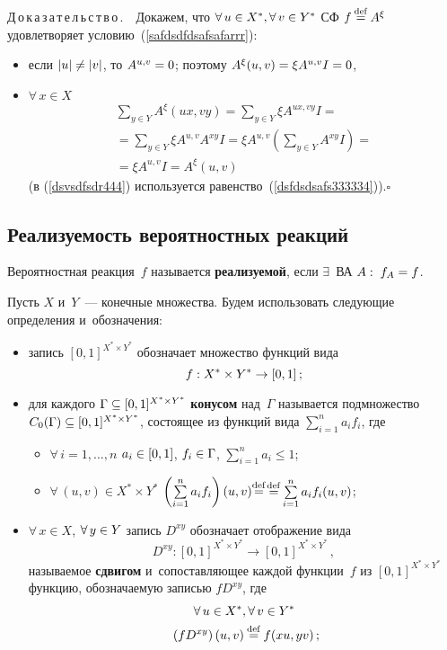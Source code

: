 \begin{multicols}{2}
\noindent
Д\,о\,к\,а\,з\,а\,т\,е\,л\,ь\,с\,т\,в\,о\,.\ \
Докажем, что  $\forall\,u\hm\in X^*,\forall\,v\hm\in Y^*$
СФ $f\mathbin{{\mathop{=}\limits^{\mathrm{def}}}} A^{\xi}$
удовлетворяет  условию~(\ref{safdsdfdsafsafarrr}):
\begin{itemize}
\item если $|u|\hm\neq |v|$, то $A^{u,v}\hm=0$;
поэтому $A^{\xi}(u,v) \hm= \xi A^{u,v} I\hm=0$,
\item $\forall\,x\in X$
\begin{multline}
\label{dsvsdfsdr444}
\sum\limits_{y\in Y}A^{\xi}(u x,v y)=
\sum\limits_{y\in Y}\xi A^{ux,vy} I=\\=
\sum\limits_{y\in Y}\xi A^{u,v} A^{xy} I=
\xi A^{u,v} (\sum\limits_{y\in Y}A^{xy} I)=\\=
\xi A^{u,v} I = A^\xi(u,v)
\end{multline}
(в (\ref{dsvsdfsdr444}) используется
равенство~(\ref{dsfdsdsafs333334})).\hfill$\square$
\end{itemize}

\subsection{Реализуемость вероятностных реакций}

Вероятностная реакция~$f$ называется \textbf{реализу\-емой}, если
$\exists$~ВА $A: \;f_A\hm=f$.


Пусть $X$ и~$Y$~--- конечные множества.
Будем использовать следующие определения и~обозначения:

\begin{itemize}
\item запись $[0,1]^{X^*\times Y^*}$ обозначает множество
 функций вида
 $$
 f:X^*\times Y^*\hm\to [0,1]\,;
 $$
\item для каждого $\Gamma\hm\subseteq [0,1]^{X^*\times Y^*}$
\textbf{конусом} над~$\Gamma$ называется подмножество
$C_0(\Gamma)\hm\subseteq [0,1]^{X^*\times Y^*}$,
состоящее из функций вида $\sum\limits_{i=1}^n
a_if_i$, где
\begin{itemize}
\item $\forall\,i=1,\ldots, n$ $a_i\hm\in [0,1]$,
$f_i\hm\in\Gamma$,
$\sum\limits_{i=1}^na_i\leq 1$;
\item $\forall\,(u,v)\in
X^*\times Y^*$ $\left(\sum\limits_{i=1}^n
a_if_i\right)(u,v)\mathbin{{\mathop{=}\limits^{\mathrm{def}}}}$\linebreak $\mathbin{{\mathop{=}\limits^{\mathrm{def}}}} \sum\limits_{i=1}^n
a_if_i(u,v)$;
\end{itemize}
\item $\forall\,x\in X$, $\forall\,y \hm\in Y$ запись $D^{xy}$
обозначает отображение вида
$$
D^{xy}: [0,1]^{X^*\times Y^*}\to [0,1]^{X^*\times Y^*}\,,
$$
называемое \textbf{сдвигом} и~сопоставляющее каждой функции~$f$ из $[0,1]^{X^*\times Y^*}$
функцию, обозначаемую записью $fD^{xy}$, где
\begin{multline}
\forall\,u\in X^*, \forall\,v \in Y^*
\\ \left(fD^{xy}\right)(u,v)\mathbin{{\mathop{=}\limits^{\mathrm{def}}}} f(xu,yv)\,;\!\!
\label{sadfsadfdsfrrrr5556}
\end{multline}


\end{itemize}
\end{multicols}
